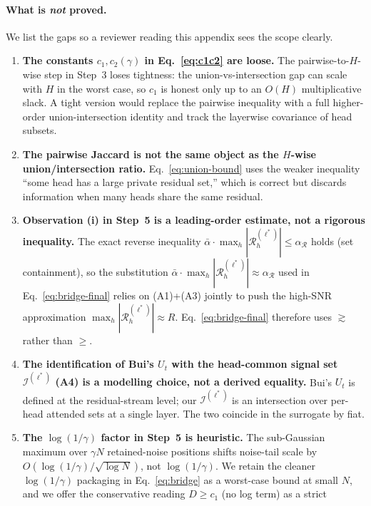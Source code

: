 \paragraph{What is \emph{not} proved.}
We list the gaps so a reviewer reading this appendix sees the scope
clearly.
\begin{enumerate}
  \item \textbf{The constants $c_1, c_2(\gamma)$ in
  Eq.~\eqref{eq:c1c2} are loose.} The pairwise-to-$H$-wise step in
  Step~3 loses tightness: the union-vs-intersection gap can scale with
  $H$ in the worst case, so $c_1$ is honest only up to an $O(H)$
  multiplicative slack. A tight version would replace the pairwise
  inequality with a full higher-order union-intersection identity and
  track the layerwise covariance of head subsets.
  \item \textbf{The pairwise Jaccard is not the same object as the
  $H$-wise union/intersection ratio.} Eq.~\eqref{eq:union-bound} uses
  the weaker inequality ``some head has a large private residual
  set,'' which is correct but discards information when many heads share
  the same residual.
  \item \textbf{Observation (i) in Step~5 is a leading-order estimate,
  not a rigorous inequality.} The exact reverse inequality $\bar\alpha
  \cdot \max_h |\mathcal{R}^{(\ell^*)}_h| \leq \alpha_{\mathcal{R}}$
  holds (set containment), so the substitution $\bar\alpha \cdot \max_h
  |\mathcal{R}^{(\ell^*)}_h| \approx \alpha_{\mathcal{R}}$ used in
  Eq.~\eqref{eq:bridge-final} relies on (A1)+(A3) jointly to push the
  high-SNR approximation $\max_h |\mathcal{R}^{(\ell^*)}_h| \approx R$.
  Eq.~\eqref{eq:bridge-final} therefore uses $\gtrsim$ rather than
  $\geq$.
  \item \textbf{The identification of Bui's $U_t$ with the head-common
  signal set $\mathcal{I}^{(\ell^*)}$ (A4) is a modelling choice, not a
  derived equality.} Bui's $U_t$ is defined at the residual-stream
  level; our $\mathcal{I}^{(\ell^*)}$ is an intersection over per-head
  attended sets at a single layer. The two coincide in the surrogate by
  fiat.
  \item \textbf{The $\log(1/\gamma)$ factor in Step~5 is heuristic.} The
  sub-Gaussian maximum over $\gamma N$ retained-noise positions shifts
  noise-tail scale by $O(\log(1/\gamma) / \sqrt{\log N})$, not
  $\log(1/\gamma)$. We retain the cleaner $\log(1/\gamma)$ packaging in
  Eq.~\eqref{eq:bridge} as a worst-case bound at small $N$, and we offer
  the conservative reading $D \geq c_1$ (no log term) as a strict

\end{enumerate}
